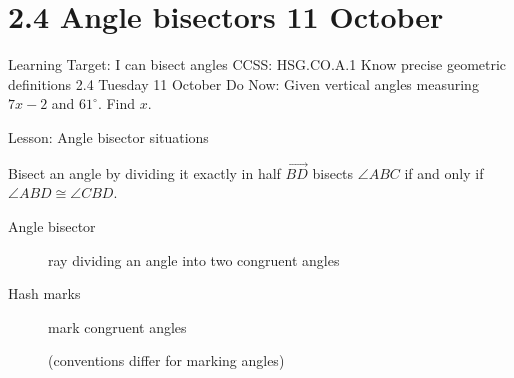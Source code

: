\documentclass[onlytextwidth]{beamer}
\begin{document}
\section{2.4 Angle bisectors \hfill 11 October}
\begin{frame}{Learning Target: I can bisect angles}
  {CCSS: HSG.CO.A.1 Know precise geometric definitions  \hfill \alert{2.4 Tuesday 11 October}}
  Do Now: Given vertical angles measuring $7x-2$ and $61^\circ$. Find $x$. \par \bigskip
   \par \vspace{1cm}
  Lesson: Angle bisector situations
  \end{frame}

\begin{frame}{Bisect an angle by dividing it exactly in half}
    $\overrightarrow{BD}$ bisects $\angle ABC$ if and only if $\angle ABD \cong \angle CBD$. \par \bigskip
    \begin{center}
      \end{center}
      \begin{description}
        \item[Angle bisector] ray dividing an angle into two congruent angles
        \item[Hash marks] mark congruent angles \par (conventions differ for marking angles)
      \end{description}
    \end{frame}
\end{document}
